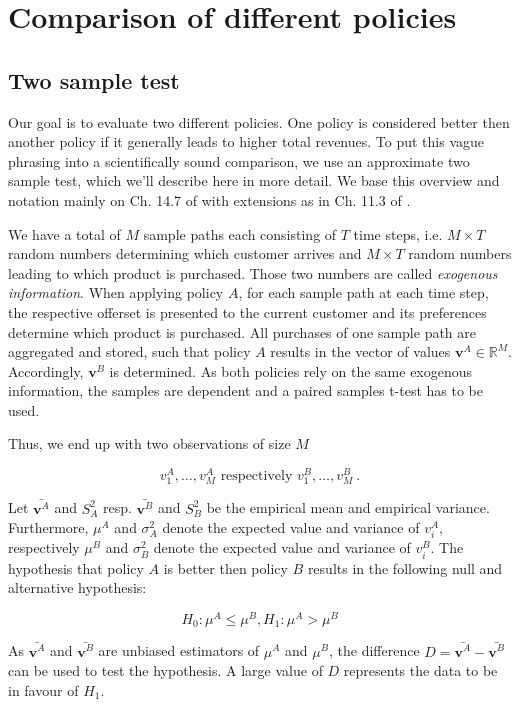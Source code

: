 \chapter{Comparison of different policies}\label{ch:ComparisonTheory}

\section{Two sample test}

Our goal is to evaluate two different policies. One policy is considered better then another policy if it generally leads to higher total revenues. To put this vague phrasing into a scientifically sound comparison, we use an approximate two sample test, which we'll describe here in more detail. We base this overview and notation mainly on Ch. 14.7 of \cite{Bamberg.2011} with extensions as in Ch. 11.3 of \cite{Fahrmeir.2007}.

We have a total of $M$ sample paths each consisting of $T$ time steps, i.e. $M \times T$ random numbers determining which customer arrives and $M \times T$ random numbers leading to which product is purchased. Those two numbers are called \textit{exogenous information}. When applying policy $A$, for each sample path at each time step, the respective offerset is presented to the current customer and its preferences determine which product is purchased. All purchases of one sample path are aggregated and stored, such that policy $A$ results in the vector of values $\mathbf{v}^A \in \mathbb{R}^M$. Accordingly, $\mathbf{v}^B$ is determined. As both policies rely on the same exogenous information, the samples are dependent and a paired samples t-test has to be used.

Thus, we end up with two observations of size $M$ 

$$v^A_1, \dots, v^A_M \text{ respectively } v^B_1, \dots, v^B_M~.$$

Let $\bar{\mathbf{v}^A}$ and $S_A^2$ resp. $\bar{\mathbf{v}^B}$ and $S_B^2$ be the empirical mean and empirical variance. Furthermore, $\mu^A$ and $\sigma_A^2$ denote the expected value and variance of $v^A_i$, respectively $\mu^B$ and $\sigma_B^2$ denote the expected value and variance of $v^B_i$. The hypothesis that policy $A$ is better then policy $B$ results in the following null and alternative hypothesis:

$$H_0: \mu^A \leq \mu^B, H_1: \mu^A > \mu^B$$

As $\bar{\mathbf{v}^A}$ and $\bar{\mathbf{v}^B}$ are unbiased estimators of $\mu^A$ and $\mu^B$, the difference $D = \bar{\mathbf{v}^A} - \bar{\mathbf{v}^B}$ can be used to test the hypothesis. A large value of $D$ represents the data to be in favour of $H_1$. 

